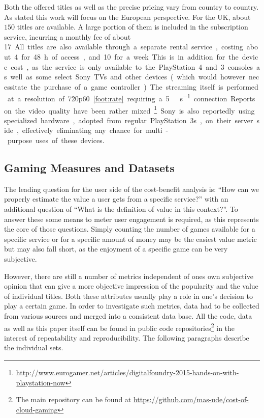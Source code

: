 Both the offered titles as well as the precise pricing vary from country to country. As stated this work will focus on the European perspective. For the UK, about $150$ titles are available. A large portion of them is included in the subscription service, incurring a monthly fee of about \SI{17}[\EUR]. All titles are also available through a separate rental service, costing about \SI{4}[\EUR] for \SI{48}{\hour} of access, and \SI{10}[\EUR] for a week. This is in addition for the device cost, as the service is only available to the PlayStation 4 and 3 consoles as well as some select Sony TVs and other devices (which would however necessitate the purchase of a game controller).

The streaming itself is performed at a resolution of 720p60\cref{foot:rate} requiring a \SI{5}{\mega\bit\per\second} connection. Reports on the video quality have been rather mixed.\footnote{\url{http://www.eurogamer.net/articles/digitalfoundry-2015-hands-on-with-playstation-now}} Sony is also reportedly using specialized hardware, adopted from regular PlayStation 3s, on their server side, effectively eliminating any chance for multi-purpose uses of these devices.





\subsection{Gaming Measures and Datasets}

The leading question for the user side of the cost-benefit analysis is: ``How can we properly estimate the value a user gets from a specific service?'' with an additional question of ``What is the definition of value in this context?''. To answer these some means to meter user engagement is required, as this represents the core of those questions. Simply counting the number of games available for a specific service or for a specific amount of money may be the easiest value metric but may also fall short, as the enjoyment of a specific game can be very subjective.

However, there are still a number of metrics independent of ones own subjective opinion that can give a more objective impression of the popularity and the value of individual titles. Both these attributes usually play a role in one's decision to play a certain game. In order to investigate such metrics, data had to be collected from various sources and merged into a consistent data base. All the code, data as well as this paper itself can be found in public code repositories\footnote{The main repository can be found at \url{https://github.com/mas-ude/cost-of-cloud-gaming}} in the interest of repeatability and reproducibility. The following paragraphs describe the individual sets.

